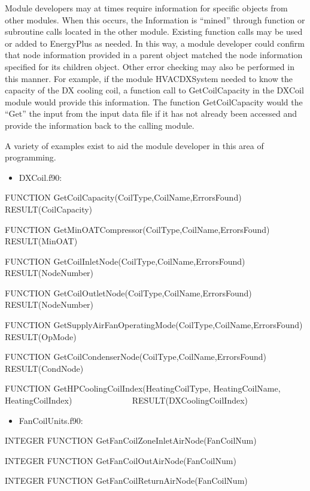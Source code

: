 Module developers may at times require information for specific objects from other modules. When this occurs, the Information is ``mined'' through function or subroutine calls located in the other module. Existing function calls may be used or added to EnergyPlus as needed. In this way, a module developer could confirm that node information provided in a parent object matched the node information specified for its children object. Other error checking may also be performed in this manner. For example, if the module HVACDXSystem needed to know the capacity of the DX cooling coil, a function call to GetCoilCapacity in the DXCoil module would provide this information. The function GetCoilCapacity would the ``Get'' the input from the input data file if it has not already been accessed and provide the information back to the calling module.

A variety of examples exist to aid the module developer in this area of programming.

\begin{itemize}
\tightlist
\item
  DXCoil.f90:
\end{itemize}

FUNCTION GetCoilCapacity(CoilType,CoilName,ErrorsFound) RESULT(CoilCapacity)

FUNCTION GetMinOATCompressor(CoilType,CoilName,ErrorsFound) RESULT(MinOAT)

FUNCTION GetCoilInletNode(CoilType,CoilName,ErrorsFound) RESULT(NodeNumber)

FUNCTION GetCoilOutletNode(CoilType,CoilName,ErrorsFound) RESULT(NodeNumber)

FUNCTION GetSupplyAirFanOperatingMode(CoilType,CoilName,ErrorsFound) RESULT(OpMode)

FUNCTION GetCoilCondenserNode(CoilType,CoilName,ErrorsFound) RESULT(CondNode)

FUNCTION GetHPCoolingCoilIndex(HeatingCoilType, HeatingCoilName, HeatingCoilIndex) ~~~~~~~~~~~~~ RESULT(DXCoolingCoilIndex)

\begin{itemize}
\tightlist
\item
  FanCoilUnits.f90:
\end{itemize}

INTEGER FUNCTION GetFanCoilZoneInletAirNode(FanCoilNum)

INTEGER FUNCTION GetFanCoilOutAirNode(FanCoilNum)

INTEGER FUNCTION GetFanCoilReturnAirNode(FanCoilNum)

